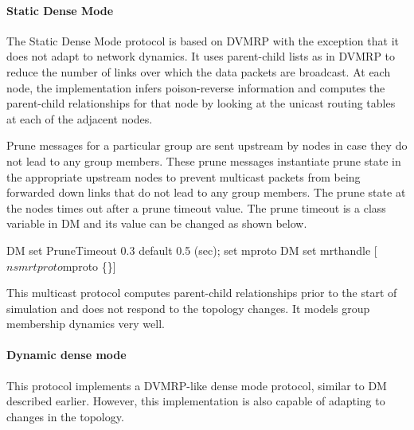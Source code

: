 {

\paragraph{Static Dense Mode}
The Static Dense Mode protocol is based on DVMRP \cite{DVMRP}
with the exception
that it does not adapt to network dynamics.  It uses parent-child
lists as in DVMRP to reduce the number of links over which the data
packets are broadcast.
At each node,
the implementation
 infers poison-reverse information
and
 computes the parent-child relationships 
 for that node by looking
at the unicast routing tables at each of the adjacent nodes.

  Prune messages for a particular group are sent
upstream by nodes in case they do not lead to any group members.
These prune messages instantiate prune state in the appropriate
upstream nodes to prevent multicast packets from being forwarded down
links that do not lead to any group members.  The prune state at the
nodes times out after a prune timeout value.  The prune timeout is a
class variable in DM and its value can be changed as shown below.
\begin{program}
	DM set PruneTimeout 0.3           \; default 0.5 (sec);
	set mproto DM
	set mrthandle [$ns mrtproto $mproto \{\}]
\end{program}
This multicast protocol computes parent-child relationships prior to
the start of simulation and does not respond to the topology
changes. It models group membership dynamics very well.

\paragraph{Dynamic dense mode}
This protocol implements a DVMRP-like dense mode protocol,
similar to DM described earlier.
However, this implementation is also capable of adapting to changes
in the topology.

}
